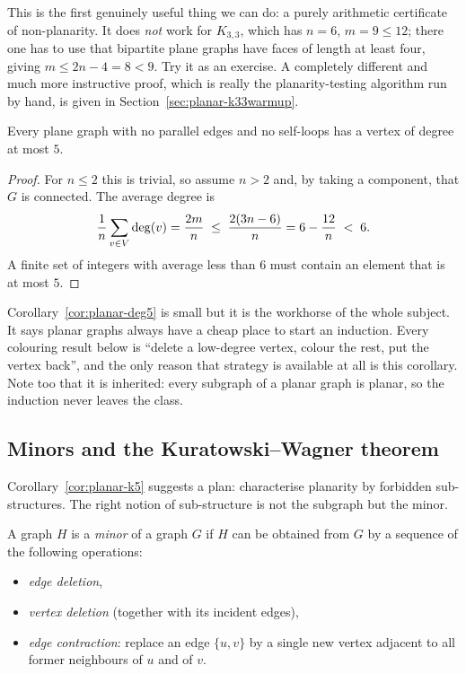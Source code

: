 This is the first genuinely useful thing we can do: a purely arithmetic
certificate of non-planarity. It does \emph{not} work for $K_{3,3}$, which has
$n = 6$, $m = 9 \le 12$; there one has to use that bipartite plane graphs have
faces of length at least four, giving $m \le 2n - 4 = 8 < 9$. Try it as an
exercise. A completely different and much more instructive proof, which is
really the planarity-testing algorithm run by hand, is given in
Section~\ref{sec:planar-k33warmup}.

\begin{corollary}\label{cor:planar-deg5}
Every plane graph with no parallel edges and no self-loops has a vertex of
degree at most $5$.
\end{corollary}

\begin{proof}
For $n \le 2$ this is trivial, so assume $n > 2$ and, by taking a component,
that $G$ is connected. The average degree is
\[
  \frac{1}{n}\sum_{v \in V} \operatorname{deg}(v) = \frac{2m}{n}
  \;\le\; \frac{2(3n-6)}{n} = 6 - \frac{12}{n} \;<\; 6 .
\]
A finite set of integers with average less than $6$ must contain an element
that is at most $5$.
\end{proof}

\begin{intuition}
Corollary~\ref{cor:planar-deg5} is small but it is the workhorse of the whole
subject. It says planar graphs always have a cheap place to start an
induction. Every colouring result below is ``delete a low-degree vertex,
colour the rest, put the vertex back'', and the only reason that strategy is
available at all is this corollary. Note too that it is inherited: every
subgraph of a planar graph is planar, so the induction never leaves the class.
\end{intuition}

\subsection{Minors and the Kuratowski--Wagner theorem}\label{sec:planar-minors}

Corollary~\ref{cor:planar-k5} suggests a plan: characterise planarity by forbidden
sub-structures. The right notion of sub-structure is not the subgraph but the
minor.

\begin{definition}[Minor]
A graph $H$ is a \emph{minor} of a graph $G$ if $H$ can be obtained from $G$ by
a sequence of the following operations:
\begin{itemize}[nosep]
  \item \emph{edge deletion},
  \item \emph{vertex deletion} (together with its incident edges),
  \item \emph{edge contraction}: replace an edge $\{u,v\}$ by a single new
        vertex adjacent to all former neighbours of $u$ and of $v$.
\end{itemize}
\end{definition}

